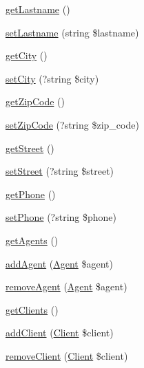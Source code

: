 \begin{DoxyCompactItemize}
\mbox{\hyperlink{class_app_1_1_entity_1_1_user_a5d606fdf02d35b79b74b91a88c09000f}{get\+Lastname}} ()
\item 
\mbox{\hyperlink{class_app_1_1_entity_1_1_user_abfe04b70a700bbd9496f76350083063f}{set\+Lastname}} (string \$lastname)
\item 
\mbox{\hyperlink{class_app_1_1_entity_1_1_user_ae9ca906fce6e9fe5fab3a6b42209d6a1}{get\+City}} ()
\item 
\mbox{\hyperlink{class_app_1_1_entity_1_1_user_a1ce8cf378e350d644c2f52042a59b0b2}{set\+City}} (?string \$city)
\item 
\mbox{\hyperlink{class_app_1_1_entity_1_1_user_a57a82c7e2cc6a5009844b8a9a9995e93}{get\+Zip\+Code}} ()
\item 
\mbox{\hyperlink{class_app_1_1_entity_1_1_user_a71404327a2dd4c39022ed57eaf894f34}{set\+Zip\+Code}} (?string \$zip\+\_\+code)
\item 
\mbox{\hyperlink{class_app_1_1_entity_1_1_user_ad804bd3a7447b83b37d6de35f2056fb2}{get\+Street}} ()
\item 
\mbox{\hyperlink{class_app_1_1_entity_1_1_user_a50fcef04f17ffeb002082b4e4d54193a}{set\+Street}} (?string \$street)
\item 
\mbox{\hyperlink{class_app_1_1_entity_1_1_user_a5e8a94cd59635ac689687849b9f5cd9d}{get\+Phone}} ()
\item 
\mbox{\hyperlink{class_app_1_1_entity_1_1_user_a4ce57d0279a4d18f80513ddacbef0af0}{set\+Phone}} (?string \$phone)
\item 
\mbox{\hyperlink{class_app_1_1_entity_1_1_user_af8ff8a6ad7be0182c2db92302bbde674}{get\+Agents}} ()
\item 
\mbox{\hyperlink{class_app_1_1_entity_1_1_user_af9b4037bde05427fa94e1f3104de6d97}{add\+Agent}} (\mbox{\hyperlink{class_app_1_1_entity_1_1_agent}{Agent}} \$agent)
\item 
\mbox{\hyperlink{class_app_1_1_entity_1_1_user_a01fc29de78c9b260ee2b5615070e1b0e}{remove\+Agent}} (\mbox{\hyperlink{class_app_1_1_entity_1_1_agent}{Agent}} \$agent)
\item 
\mbox{\hyperlink{class_app_1_1_entity_1_1_user_ae4ce9d283573b2488e049b575c326547}{get\+Clients}} ()
\item 
\mbox{\hyperlink{class_app_1_1_entity_1_1_user_aea0c1979dbf5609a81ca5b57e6254a16}{add\+Client}} (\mbox{\hyperlink{class_app_1_1_entity_1_1_client}{Client}} \$client)
\item 
\mbox{\hyperlink{class_app_1_1_entity_1_1_user_a7c5e56de4ebad3c95e04027b4d21e2cb}{remove\+Client}} (\mbox{\hyperlink{class_app_1_1_entity_1_1_client}{Client}} \$client)

\end{DoxyCompactItemize}
